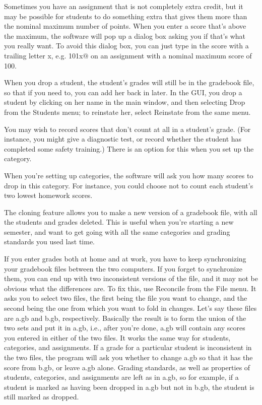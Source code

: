 \documentclass{opengrade_doc}
\begin{document}
Sometimes you have an assignment that is not completely extra credit,
but it may be possible for students to do something extra that gives
them more than the nominal maximum number of points. 
When you enter a score that's above the maximum, the software will
pop up a dialog box asking you if that's what you really want. To
avoid this dialog box, you can just type in the score with a trailing
letter x, e.g. \verb@101x@ on an assignment with a nominal maximum score
of 100.

When you drop a student, the student's grades will still be in
the gradebook file, so that if you need to, you can add her back
in later. In the GUI, you drop a student by clicking on her name
in the main window, and then selecting Drop from the
Students menu; to reinstate her, select Reinstate from the
same menu.

You may wish to record scores that don't count at all in a student's
grade. (For instance, you might give a diagnostic test, or record whether
the student has completed some safety training.)
There is an option for this when you set up the category.

When you're setting up categories, the software will ask you how many
scores to drop in this category. For instance, you could choose not
to count each student's two lowest homework scores.

The cloning feature allows you to make a new version of a gradebook file,
with all the students and grades deleted. This is useful when you're
starting a new semester, and want to get going with all the same
categories and grading standards you used last time.

If you enter grades both at home and at work, you have to keep synchronizing
your gradebook files between the two computers. If you forget to synchronize
them, you can end up with two inconsistent versions of the file, and it may
not be obvious what the differences are. To fix this, use Reconcile from the
File menu. It asks you to select two files, the first being the file you
want to change, and the second being the one from which you want to fold
in changes. Let's say these files are a.gb and b.gb, respectively. Basically
the result is to form the union of the two sets and put it in a.gb, i.e.,
after you're done, a.gb will contain any scores you entered in either of
the two files. It works the same way for students, categories, and assignments.
If a grade for a particular student is inconsistent in the two files, the program
will ask you whether to change a.gb so that it has the score from b.gb, or
leave a.gb alone. Grading standards, as well as properties of students, categories, and assignments are
left as in a.gb, so for example, if a student is marked as having been dropped
in a.gb but not in b.gb, the student is still marked as dropped. 
\end{document}
